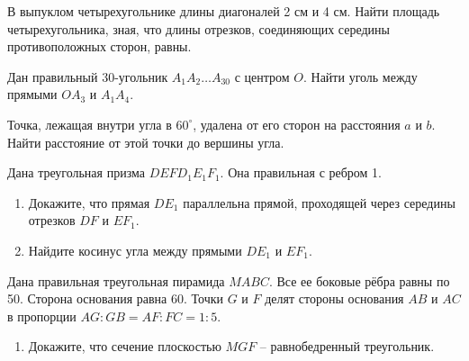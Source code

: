 \documentclass[geometry,a5paper]{pum}
\begin{document}
\begin{exercises}
  \begin{question}
    В выпуклом четырехугольнике длины диагоналей 2 см и 4 см. Найти площадь четырехугольника, зная, что длины отрезков, соединяющих середины противоположных сторон, равны.
  \end{question}
  \begin{question}
    Дан правильный 30-угольник $A_1 A_2 \ldots A_{30}$ с центром $O$. Найти уголь между прямыми $OA_3$ и $A_1 A_4$.
  \end{question}
  \begin{question}
    Точка, лежащая внутри угла в $60^\circ$, удалена от его сторон на расстояния $a$ и $b$. Найти расстояние от этой точки до вершины угла.
  \end{question}
  \begin{question}
    Дана треугольная призма $DEFD_1E_1F_1$. Она правильная с ребром 1.
    \begin{enumerate}[nosep,label=\asbuk*), ref=\asbuk*]
    \item Докажите, что прямая $DE_1$ параллельна прямой, проходящей через середины отрезков $DF$ и $EF_1$.
    \item Найдите косинус угла между прямыми $DE_1$ и $EF_1$.
  \end{enumerate}
\end{question}
  \begin{question}
    Дана правильная треугольная пирамида $MABC$. Все ее боковые рёбра равны по 50. Сторона основания равна 60. Точки $G$ и $F$ делят стороны основания $AB$ и $AC$ в пропорции $AG:GB=AF:FC=1:5$.
    \begin{enumerate}[nosep,label=\asbuk*), ref=\asbuk*]
    \item Докажите, что сечение плоскостью $MGF$ -- равнобедренный треугольник.

\end{enumerate}
\end{question}
\end{exercises}
\end{document}
